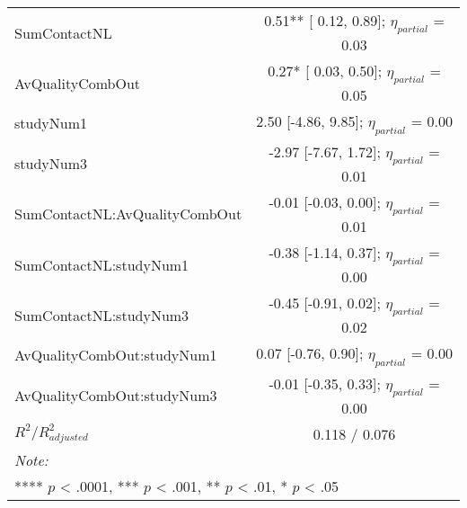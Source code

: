 \begin{landscape}
\begin{table}
\begin{minipage}[t][\textheight][t]{\textwidth}
{\begin{tabular}[t]{lcccccc}
\hspace{1em}SumContactNL & \multicolumn{6}{c}{ 0.51** [ 0.12,  0.89]; $\eta_{partial}$ = 0.03}\\
\hspace{1em}AvQualityCombOut & \multicolumn{6}{c}{ 0.27* [ 0.03,  0.50]; $\eta_{partial}$ = 0.05}\\
\hspace{1em}studyNum1 & \multicolumn{6}{c}{ 2.50 [-4.86,  9.85]; $\eta_{partial}$ = 0.00}\\
\hspace{1em}studyNum3 & \multicolumn{6}{c}{-2.97 [-7.67,  1.72]; $\eta_{partial}$ = 0.01}\\
\hspace{1em}SumContactNL:AvQualityCombOut & \multicolumn{6}{c}{-0.01 [-0.03,  0.00]; $\eta_{partial}$ = 0.01}\\
\hspace{1em}SumContactNL:studyNum1 & \multicolumn{6}{c}{-0.38 [-1.14,  0.37]; $\eta_{partial}$ = 0.00}\\
\hspace{1em}SumContactNL:studyNum3 & \multicolumn{6}{c}{-0.45 [-0.91,  0.02]; $\eta_{partial}$ = 0.02}\\
\hspace{1em}AvQualityCombOut:studyNum1 & \multicolumn{6}{c}{ 0.07 [-0.76,  0.90]; $\eta_{partial}$ = 0.00}\\
\hspace{1em}AvQualityCombOut:studyNum3 & \multicolumn{6}{c}{-0.01 [-0.35,  0.33]; $\eta_{partial}$ = 0.00}\\
\hspace{1em}$R^2 / R^2_{adjusted}$ & \multicolumn{6}{c}{0.118 / 0.076}\\
\bottomrule
\multicolumn{7}{l}{\rule{0pt}{1em}\textit{Note: }}\\
\multicolumn{7}{l}{\rule{0pt}{1em}**** $p$ < .0001, *** $p$ < .001, ** $p$ < .01, * $p$ < .05}\\
\end{tabular}}
\end{minipage}
\end{table}
\end{landscape}
